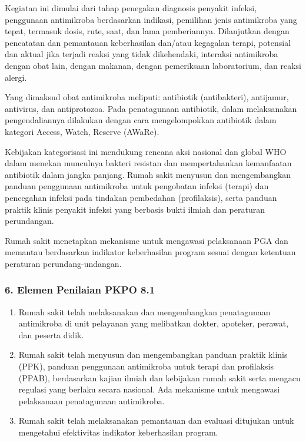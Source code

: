 \documentclass[
]{book}
\providecommand{\tightlist}{%
  \setlength{\itemsep}{0pt}\setlength{\parskip}{0pt}}
\begin{document}
Kegiatan ini dimulai dari tahap penegakan diagnosis penyakit infeksi, penggunaan antimikroba berdasarkan indikasi, pemilihan jenis antimikroba yang tepat, termasuk dosis, rute, saat, dan lama pemberiannya. Dilanjutkan dengan pencatatan dan pemantauan keberhasilan dan/atau kegagalan terapi, potensial dan aktual jika terjadi reaksi yang tidak dikehendaki, interaksi antimikroba dengan obat lain, dengan makanan, dengan pemeriksaan laboratorium, dan reaksi alergi.

Yang dimaksud obat antimikroba meliputi: antibiotik (antibakteri), antijamur, antivirus, dan antiprotozoa. Pada penatagunaan antibiotik, dalam melaksanakan pengendaliannya dilakukan dengan cara mengelompokkan antibiotik dalam kategori Access, Watch, Reserve (AWaRe).

Kebijakan kategorisasi ini mendukung rencana aksi nasional dan global WHO dalam menekan munculnya bakteri resistan dan mempertahankan kemanfaatan antibiotik dalam jangka panjang. Rumah sakit menyusun dan mengembangkan panduan penggunaan antimikroba untuk pengobatan infeksi (terapi) dan pencegahan infeksi pada tindakan pembedahan (profilaksis), serta panduan praktik klinis penyakit infeksi yang berbasis bukti ilmiah dan peraturan perundangan.

Rumah sakit menetapkan mekanisme untuk mengawasi pelaksanaan PGA dan memantau berdasarkan indikator keberhasilan program sesuai dengan ketentuan peraturan perundang-undangan.

\hypertarget{elemen-penilaian-pkpo-8.1}{%
\subsubsection*{6. Elemen Penilaian PKPO 8.1}\label{elemen-penilaian-pkpo-8.1}}

\begin{enumerate}
\def\labelenumi{\alph{enumi}.}
\tightlist
\item
  Rumah sakit telah melaksanakan dan mengembangkan penatagunaan antimikroba di unit pelayanan yang melibatkan dokter, apoteker, perawat, dan peserta didik.
\item
  Rumah sakit telah menyusun dan mengembangkan panduan praktik klinis (PPK), panduan penggunaan antimikroba untuk terapi dan profilaksis (PPAB), berdasarkan kajian ilmiah dan kebijakan rumah sakit serta mengacu regulasi yang berlaku secara nasional. Ada mekanisme untuk mengawasi pelaksanaan penatagunaan antimikroba.
\item
  Rumah sakit telah melaksanakan pemantauan dan evaluasi ditujukan untuk mengetahui efektivitas indikator keberhasilan program.
\end{enumerate}
\end{document}
